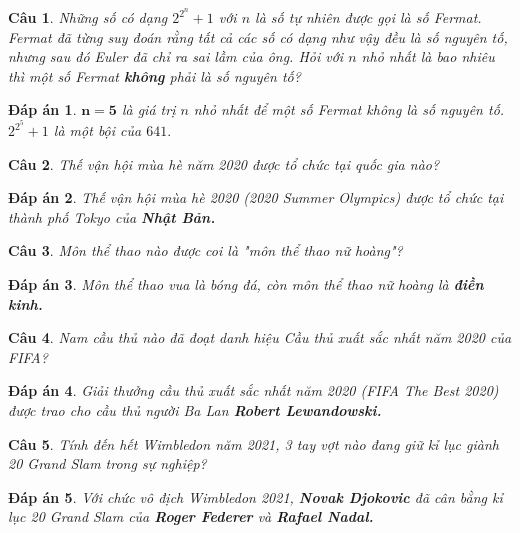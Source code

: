 \documentclass[12pt,a4paper]{article}
\newtheorem{ques}{Câu}
\theoremstyle{nonumberplain}
\newtheorem{ans}{Đáp án}
\begin{document}
\begin{ques}
Những số có dạng \(2^{2^n} + 1\) với \(n\) là số tự nhiên được gọi là số Fermat. Fermat đã từng suy đoán rằng tất cả các số có dạng như vậy đều là số nguyên tố, nhưng sau đó Euler đã chỉ ra sai lầm của ông. Hỏi với \(n\) nhỏ nhất là bao nhiêu thì một số Fermat \textbf{không} phải là số nguyên tố?
\end{ques}
\begin{mybox} \begin{ans}
\(\mathbf{n = 5}\) là giá trị \(n\) nhỏ nhất để một số Fermat không là số nguyên tố.\\
\(2^{2^5} + 1\) là một bội của \(641.\)
\end{ans} \end{mybox}
\begin{ques}
Thế vận hội mùa hè năm 2020 được tổ chức tại quốc gia nào?
\end{ques}
\begin{mybox} \begin{ans}
Thế vận hội mùa hè 2020 (2020 Summer Olympics) được tổ chức tại thành phố Tokyo của \textbf{Nhật Bản.}
\end{ans} \end{mybox}
\begin{ques}
Môn thể thao nào được coi là \textit{"môn thể thao nữ hoàng"}?
\end{ques}
\begin{mybox} \begin{ans}
Môn thể thao vua là bóng đá, còn môn thể thao nữ hoàng là \textbf{điền kinh.}
\end{ans} \end{mybox}
\begin{ques}
Nam cầu thủ nào đã đoạt danh hiệu Cầu thủ xuất sắc nhất năm 2020 của FIFA?
\end{ques}
\begin{mybox} \begin{ans}
Giải thưởng cầu thủ xuất sắc nhất năm 2020 (FIFA The Best 2020) được trao cho cầu thủ người Ba Lan \textbf{Robert Lewandowski.}
\end{ans} \end{mybox}
\begin{ques}
Tính đến hết Wimbledon năm 2021, 3 tay vợt nào đang giữ kỉ lục giành 20 Grand Slam trong sự nghiệp?
\end{ques}
\begin{mybox} \begin{ans}
Với chức vô địch Wimbledon 2021, \textbf{Novak Djokovic} đã cân bằng kỉ lục 20 Grand Slam của \textbf{Roger Federer} và \textbf{Rafael Nadal.}
\end{ans} \end{mybox}
\end{document}
